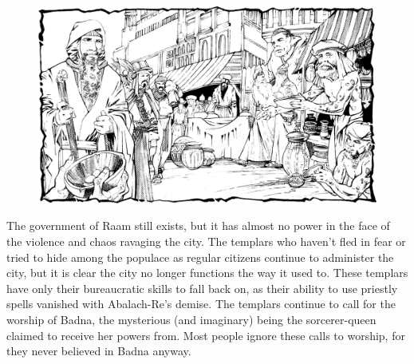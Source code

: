 {
\begin{figure}[b!]
\centering
\includegraphics[width=\textwidth]{images/raam-2.png}
\end{figure}

	The government of Raam still exists, but it has almost no power in the face of the violence and chaos ravaging the city. The templars who haven't fled in fear or tried to hide among the populace as regular citizens continue to administer the city, but it is clear the city no longer functions the way it used to. These templars have only their bureaucratic skills to fall back on, as their ability to use priestly spells vanished with Abalach-Re's demise. The templars continue to call for the worship of Badna, the mysterious (and imaginary) being the sorcerer-queen claimed to receive her powers from. Most people ignore these calls to worship, for they never believed in Badna anyway.
}
